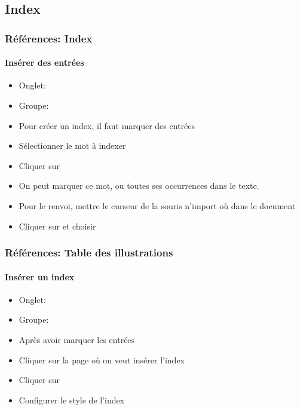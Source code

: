 \documentclass[xcolor=table]{beamer}
\begin{document}
\subsection{Index}

\begin{frame}[t]
\frametitle{Références: Index}
\framesubtitle{Insérer des entrées}

\begin{minipage}{0.69\textwidth}
\begin{itemize}
	\item Onglet: 
	\item Groupe: 
	\item Pour créer un index, il faut marquer des entrées 
	\item Sélectionner le mot à indexer 
	\item Cliquer sur 
	\item On peut marquer ce mot, ou toutes ses occurrences dans le texte.
	\item Pour le renvoi, mettre le curseur de la  souris n'import où dans le document 
	\item Cliquer sur  et choisir 
\end{itemize}
\end{minipage}
\begin{minipage}{0.30\textwidth}
\begin{flushright}
\end{flushright}
\vspace{-6pt}

\end{minipage}

\end{frame}

\begin{frame}[t]
\frametitle{Références: Table des illustrations}
\framesubtitle{Insérer un index}

\begin{minipage}{0.61\textwidth}
\begin{itemize}
	\item Onglet: 
	\item Groupe: 
	\item Après avoir marquer les entrées
	\item Cliquer sur la page où on veut insérer l'index
	\item Cliquer sur 
	\item Configurer le style de l'index
\end{itemize}
\end{minipage}
\begin{minipage}{0.38\textwidth}
\begin{flushright}
\end{flushright}
\vspace{-6pt}

\end{minipage}

\end{frame}
\end{document}
